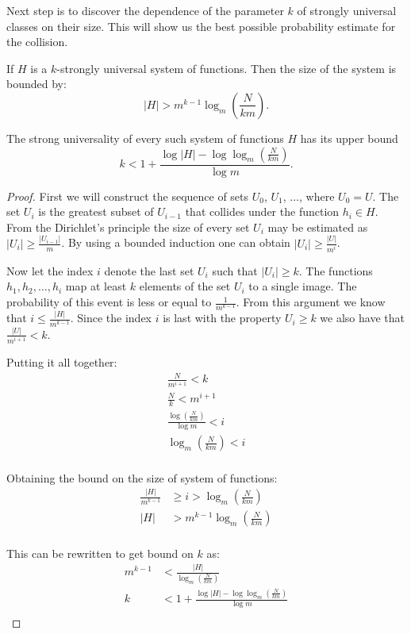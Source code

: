Next step is to discover the dependence of the parameter $k$ of strongly universal classes on their size. This will show us the best possible probability estimate for the collision.
\begin{theorem}
If $H$ is a $k$-strongly universal system of functions. Then the size of the system is bounded by:
\begin{displaymath}
|H| > m^{k - 1} \log_m \left( \frac{N}{km} \right) \textit{.}
\end{displaymath}

The strong universality of every such system of functions $H$ has its upper bound
\begin{displaymath}
k < 1 + \frac{\log |H| - \log \log_m \left( \frac{N}{km} \right)}{\log m} \textit{.}
\end{displaymath}
\end{theorem}
\begin{proof}
First we will construct the sequence of sets $U_0$, $U_1$, $\dots$, where $U_0 = U$. The set $U_i$ is the greatest subset of $U_{i - 1}$ that collides under the function $h_i \in H$. From the Dirichlet's principle the size of every set $U_i$ may be estimated as $|U_i| \geq \frac{|U_{i - 1}|}{m}$. By using a bounded induction one can obtain $|U_i| \geq \frac{|U|}{m^i}$.

Now let the index $i$ denote the last set $U_i$ such that $|U_i| \geq k$. The functions $h_1, h_2,\dots, h_i$ map at least $k$ elements of the set $U_i$ to a single image. The probability of this event is less or equal to $\frac{1}{m ^ {k - 1}}$. From this argument we know that $i \leq \frac{|H|}{m ^ {k - 1}}$. Since the index $i$ is last with the property $U_i \geq k$ we also have that $\frac{|U|}{m ^ {i + 1}} < k$. 

Putting it all together:
\begin{gather*}
\frac{N}{m^{i + 1}} < k \\
\frac{N}{k} < m ^ {i + 1} \\
\frac{\log \left( \frac{N}{km} \right)}{\log m} < i \\
\log_m \left( \frac{N}{km} \right) < i \\
\end{gather*}

Obtaining the bound on the size of system of functions:
\begin{displaymath}
\begin{split}
\frac{|H|}{m^{k - 1}} & \geq i > \log_m \left( \frac{N}{km} \right) \\
|H| & > m^{k - 1} \log_m \left( \frac{N}{km} \right) \\
\end{split}
\end{displaymath}

This can be rewritten to get bound on $k$ as:
\begin{displaymath}
\begin{split}
m^{k - 1} & < \frac{|H|}{\log_m \left( \frac{N}{km} \right)} \\
k & < 1 + \frac{\log |H| - \log \log_m \left( \frac{N}{km} \right)}{\log m} \\
\end{split}
\end{displaymath}
\end{proof}
